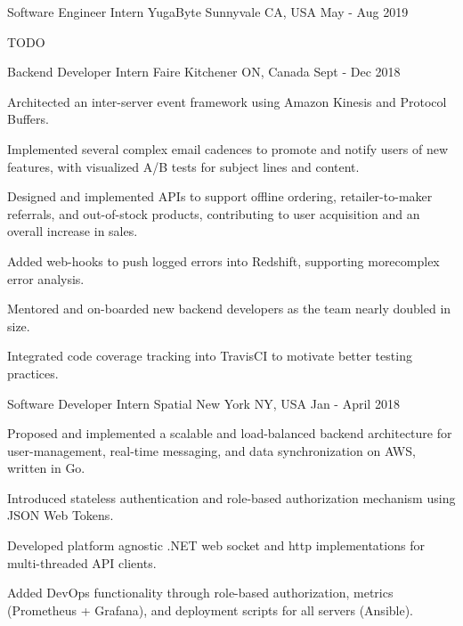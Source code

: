 
\begin{cventries}

\cventry
    {Software Engineer Intern}
    {YugaByte}
    {Sunnyvale CA, USA}
    {May - Aug 2019}
    {
      \begin{cvitems}
        \item TODO
      \end{cvitems}
    }

\cventry
    {Backend Developer Intern}
    {Faire}
    {Kitchener ON, Canada}
    {Sept - Dec 2018}
    {
      \begin{cvitems}
        \item Architected an inter-server event framework using Amazon Kinesis and Protocol Buffers.
        \item Implemented several complex email cadences to promote and notify users of new features,
        with visualized A/B tests for subject lines and content.
        \item Designed and implemented APIs to support offline ordering, retailer-to-maker referrals,
        and out-of-stock products, contributing to user acquisition and an overall increase in sales.
        \item Added web-hooks to push logged errors into Redshift, supporting morecomplex error analysis.
        \item Mentored and on-boarded new backend developers as the team nearly doubled in size.
        \item Integrated code coverage tracking into TravisCI to motivate better testing practices.
      \end{cvitems}
    }
    
\cventry
    {Software Developer Intern}
    {Spatial}
    {New York NY, USA}
    {Jan - April 2018}
    {
      \begin{cvitems}
        \item Proposed and implemented a scalable and load-balanced backend architecture for user-management,
        real-time messaging, and data synchronization on AWS, written in Go.
        \item Introduced stateless authentication and role-based authorization mechanism using JSON Web Tokens.
        \item Developed platform agnostic .NET web socket and http implementations for multi-threaded API clients.
        \item Added DevOps functionality through role-based authorization, metrics (Prometheus + Grafana),
        and deployment scripts for all servers (Ansible).
      \end{cvitems}
    }
    

\end{cventries}
